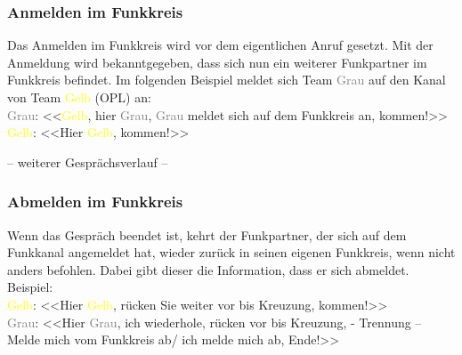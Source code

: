 \subsubsection{Anmelden im Funkkreis}
Das Anmelden im Funkkreis wird vor dem eigentlichen Anruf gesetzt. Mit der Anmeldung wird bekanntgegeben, dass sich nun ein weiterer Funkpartner im Funkkreis befindet.
Im folgenden Beispiel meldet sich Team \textcolor{gray}{Grau} auf den Kanal von Team \textcolor{yellow}{Gelb} (OPL) an: \\
\textcolor{gray}{Grau}: <<\textcolor{yellow}{Gelb}, hier \textcolor{gray}{Grau}, \textcolor{gray}{Grau} meldet sich auf dem Funkkreis an, kommen!>> \\
\textcolor{yellow}{Gelb}: <<Hier \textcolor{yellow}{Gelb}, kommen!>> \\ 
\begin{center}
– weiterer Gesprächsverlauf –
\end{center}
\subsubsection{Abmelden im Funkkreis}
Wenn das Gespräch beendet ist, kehrt der Funkpartner, der sich auf dem Funkkanal angemeldet hat, wieder zurück in seinen eigenen Funkkreis, wenn nicht anders befohlen. Dabei gibt dieser die Information, dass er sich abmeldet. \\
Beispiel: \\
\textcolor{yellow}{Gelb}: <<Hier \textcolor{yellow}{Gelb}, rücken Sie weiter vor bis Kreuzung, kommen!>> \\
\textcolor{gray}{Grau}: <<Hier \textcolor{gray}{Grau}, ich wiederhole, rücken vor bis Kreuzung, - Trennung – Melde mich vom Funkkreis ab/ ich melde mich ab, Ende!>> \\

